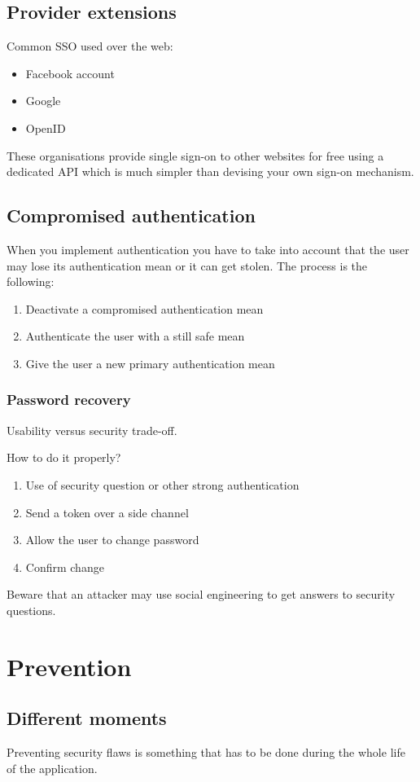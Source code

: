 \subsection{Provider extensions}
Common SSO used over the web:
\begin{itemize}
\item Facebook account
\item Google
\item OpenID
\end{itemize}
These organisations provide single sign-on to other websites for free
using a dedicated API which is much simpler than devising your own
sign-on mechanism.
\subsection{Compromised authentication}
When you implement authentication you have to take into account that the user may lose its authentication mean or it can get stolen.
The process is the following:
\begin{enumerate}
\item Deactivate a compromised authentication mean
\item Authenticate the user with a still safe mean
\item Give the user a new primary authentication mean
\end{enumerate}
\subsubsection{Password recovery}
Usability versus security trade-off.

How to do it properly?
\begin{enumerate}
\item Use of security question or other strong authentication
\item Send a token over a side channel
\item Allow the user to change password
\item Confirm change
\end{enumerate}
Beware that an attacker may use social engineering to get answers to security questions.
\section{Prevention}

\subsection{Different moments}
Preventing security flaws is something that has to be done during the
whole life of the application.

